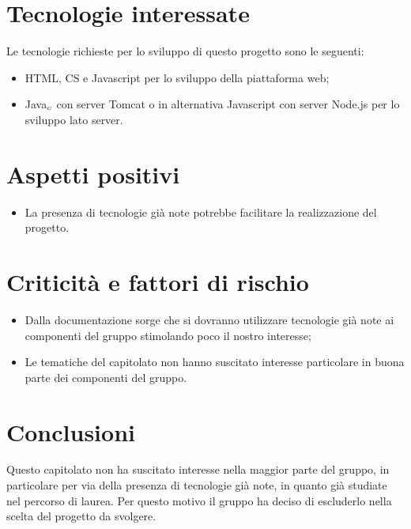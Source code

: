 \section{Tecnologie interessate} \label{C4TecnologieInteressate}
Le tecnologie richieste per lo sviluppo di questo progetto sono le seguenti:
\begin{itemize}
	\item HTML, CS e Javascript per lo sviluppo della piattaforma web;
	\item Java$_{\scaleto{G}{3pt}}$ con server Tomcat o in alternativa Javascript con server Node.js per lo sviluppo lato server.
\end{itemize}
\section{Aspetti positivi} \label{C4AspettiPositivi}
\begin{itemize}
	\item La presenza di tecnologie già note potrebbe facilitare la realizzazione del progetto.
\end{itemize}
\section{Criticità e fattori di rischio} \label{C4CriticitàEFattoriDiRischio}
\begin{itemize}
	\item Dalla documentazione sorge che si dovranno utilizzare tecnologie già note ai componenti del gruppo stimolando poco il nostro interesse;
	\item Le tematiche del capitolato non hanno suscitato interesse particolare in buona parte dei componenti del gruppo.
\end{itemize}
\section{Conclusioni} \label{C4Conclusioni}
Questo capitolato non ha suscitato interesse nella maggior parte del gruppo, in particolare per via della presenza di tecnologie già note, in quanto già studiate nel percorso di laurea. Per questo motivo il gruppo ha deciso di escluderlo nella scelta del progetto da svolgere.